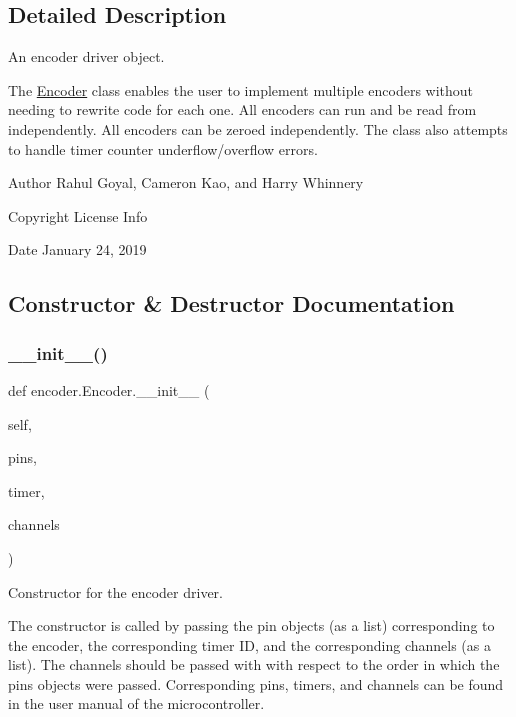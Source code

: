 \subsection{Detailed Description}
An encoder driver object. 

The \mbox{\hyperlink{classencoder_1_1_encoder}{Encoder}} class enables the user to implement multiple encoders without needing to rewrite code for each one. All encoders can run and be read from independently. All encoders can be zeroed independently. The class also attempts to handle timer counter underflow/overflow errors. \begin{DoxyAuthor}{Author}
Rahul Goyal, Cameron Kao, and Harry Whinnery 
\end{DoxyAuthor}
\begin{DoxyCopyright}{Copyright}
License Info 
\end{DoxyCopyright}
\begin{DoxyDate}{Date}
January 24, 2019 
\end{DoxyDate}


\subsection{Constructor \& Destructor Documentation}
\mbox{\label{classencoder_1_1_encoder_a34939827412badc93f8744540676e833}} 
\subsubsection{\texorpdfstring{\+\_\+\+\_\+init\+\_\+\+\_\+()}{\_\_init\_\_()}}
{\footnotesize\ttfamily def encoder.\+Encoder.\+\_\+\+\_\+init\+\_\+\+\_\+ (\begin{DoxyParamCaption}\item[{}]{self,  }\item[{}]{pins,  }\item[{}]{timer,  }\item[{}]{channels }\end{DoxyParamCaption})}



Constructor for the encoder driver. 

The constructor is called by passing the pin objects (as a list) corresponding to the encoder, the corresponding timer ID, and the corresponding channels (as a list). The channels should be passed with with respect to the order in which the pins objects were passed. Corresponding pins, timers, and channels can be found in the user manual of the microcontroller.


